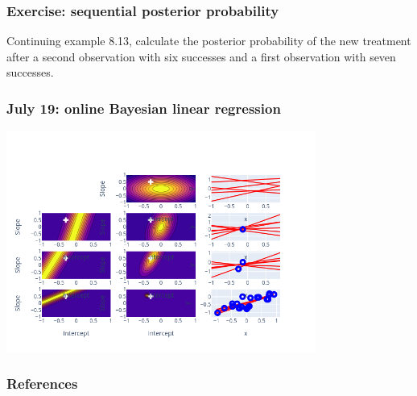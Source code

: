 \begin{frame}
    \frametitle{Exercise: sequential posterior probability}

    Continuing example 8.13, calculate the posterior probability of the new
    treatment after a second observation with six successes and a first
    observation with seven successes.

\end{frame}

\begin{frame}
    \frametitle{July 19: online Bayesian linear regression}

    \begin{center}
        \href{figures/onlineBayesianLinearRegression_nSamples20.html}{\includegraphics[width=4in]{figures/onlineBayesianLinearRegression_nSamples20.png}}
    \end{center}

\end{frame}

\begin{frame}
    \frametitle{References}

    \tiny{
        
        
    }
\end{frame}

